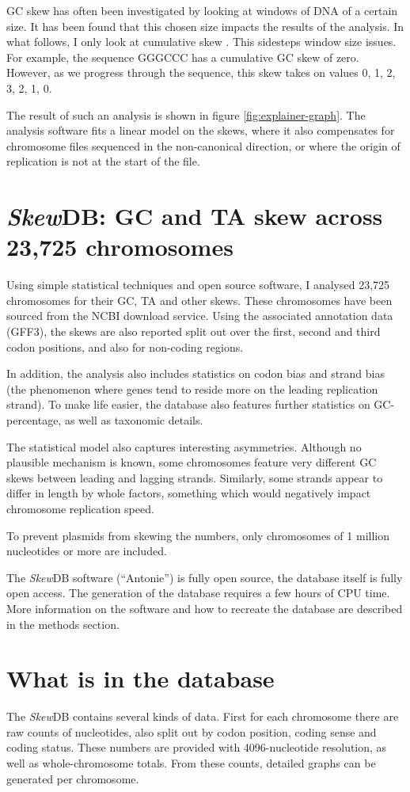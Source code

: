 \documentclass[9pt,twocolumn,twoside]{pnas-new}
\begin{document}
GC skew has often been investigated by looking at windows of DNA of a certain size. It has been found that this chosen size impacts the results of the analysis. In what follows, I only look at cumulative skew \cite{grigoriev_analyzing_1998}. This sidesteps window size issues. For example, the sequence GGGCCC has a cumulative GC skew of zero. However, as we progress through the sequence, this skew takes on values 0, 1, 2, 3, 2, 1, 0.

The result of such an analysis is shown in figure \ref{fig:explainer-graph}. The analysis software fits a linear model on the skews, where it also compensates for chromosome files sequenced in the non-canonical direction, or where the origin of replication is not at the start of the file.

\section*{\emph{Skew}DB: GC and TA skew across 23,725 chromosomes}
Using simple statistical techniques and open source software, I analysed 23,725 chromosomes for their GC, TA and other skews.
These chromosomes have been sourced from the NCBI download service. Using the associated annotation data (GFF3), the skews are also reported split out over the first, second and third codon positions, and also for non-coding regions.

In addition, the analysis also includes statistics on codon bias and strand bias (the phenomenon where genes tend to reside more on the leading replication strand). To make life easier, the database also features further statistics on GC-percentage, as well as taxonomic details.

The statistical model also captures interesting asymmetries. Although no plausible mechanism is known, some chromosomes feature very different GC skews between leading and lagging strands. Similarly, some strands appear to differ in length by whole factors, something which would negatively impact chromosome replication speed.

To prevent plasmids from skewing the numbers, only chromosomes of 1 million nucleotides or more are included. 

The \emph{Skew}DB software (``Antonie'') is fully open source, the database itself is fully open access. The generation of the database requires a few hours of CPU time. More information on the software and how to recreate the database are described in the methods section.

\section*{What is in the database}
The \emph{Skew}DB contains several kinds of data. First for each chromosome there are raw counts of nucleotides, also split out by codon position, coding sense and coding status. These numbers are provided with 4096-nucleotide resolution, as well as whole-chromosome totals. From these counts, detailed graphs can be generated per chromosome.
\end{document}
